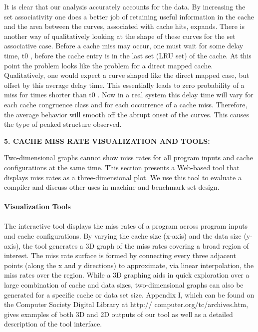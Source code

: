 \documentclass[14pt]{article}
\begin{document}
It is clear that our analysis accurately accounts for the data. By increasing the set associativity one does a better job of retaining useful information in the cache and the area between the curves, associated with cache hits, expands. There is another way of qualitatively looking at the shape of these curves for the set associative case. Before a cache miss may occur, one must wait for some delay time, t0 , before the cache entry is in the last set (LRU set) of the cache. At this point the problem looks like the problem for a direct mapped cache. Qualitatively, one would expect a curve shaped like the direct mapped case, but offset by this average delay time. This essentially leads to zero probability of a miss for times shorter than t0 . Now in a real system this delay time will vary for each cache congruence class and for each occurrence of a cache miss. Therefore, the average behavior will smooth off the abrupt onset of the curves. This causes the type of peaked structure observed.  


\begin{center}
\textbf{5. CACHE MISS RATE VISUALIZATION AND TOOLS:}
\end{center}
Two-dimensional graphs cannot show miss rates for all program inputs and cache configurations at the same time. This section presents a Web-based tool that displays miss rates as a three-dimensional plot. We use this tool to evaluate a compiler and discuss other uses in machine and benchmark-set design.
\\\\
\textbf{Visualization Tools}\\\\
The interactive tool displays the miss rates of a program across program inputs and cache configurations. By varying the cache size (x-axis) and the data size (y-axis), the tool generates a 3D graph of the miss rates covering a broad region of interest. The miss rate surface is formed by connecting every three adjacent points (along the x and y directions) to approximate, via linear interpolation, the miss rates over the region. While a 3D graphing aids in quick exploration over a large combination of cache and data sizes, two-dimensional graphs can also be generated for a specific cache or data set size. Appendix I, which can be found on the Computer Society Digital Library at http:// computer.org/tc/archives.htm, gives examples of both 3D and 2D outputs of our tool as well as a detailed description of the tool interface. 
\end{document}
